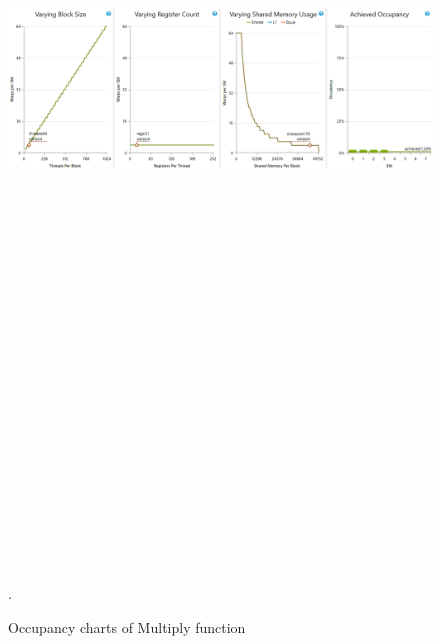 \documentclass[oneside,openright,12pt,final,en]{mgr}
\begin{document}
\begin{figure}[H]
	\centering
	\includegraphics[width=\textwidth, height=26cm,keepaspectratio]{mull_occupancy_charts}.
	\caption{Occupancy charts of Multiply function}
	\label{fig:multiply_occupancy_charts}
\end{figure}
\end{document}
